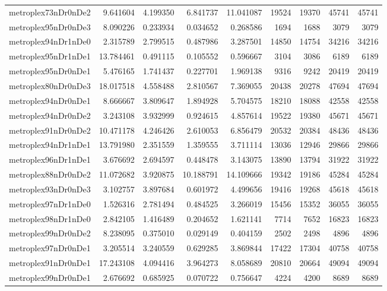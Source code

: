 \begin{longtable}{|l|r|r|r|r|r|r|r|r|}
metroplex73nDr0nDe2 & 9.641604 & 4.199350 & 6.841737 & 11.041087 & 19524 & 19370 & 45741 & 45741 \\
metroplex95nDr0nDe3 & 8.090226 & 0.233934 & 0.034652 & 0.268586 & 1694 & 1688 & 3079 & 3079 \\
metroplex94nDr1nDe0 & 2.315789 & 2.799515 & 0.487986 & 3.287501 & 14850 & 14754 & 34216 & 34216 \\
metroplex95nDr1nDe1 & 13.784461 & 0.491115 & 0.105552 & 0.596667 & 3104 & 3086 & 6189 & 6189 \\
metroplex95nDr0nDe1 & 5.476165 & 1.741437 & 0.227701 & 1.969138 & 9316 & 9242 & 20419 & 20419 \\
metroplex80nDr0nDe3 & 18.017518 & 4.558488 & 2.810567 & 7.369055 & 20438 & 20278 & 47694 & 47694 \\
metroplex94nDr0nDe1 & 8.666667 & 3.809647 & 1.894928 & 5.704575 & 18210 & 18088 & 42558 & 42558 \\
metroplex94nDr0nDe2 & 3.243108 & 3.932999 & 0.924615 & 4.857614 & 19522 & 19380 & 45671 & 45671 \\
metroplex91nDr0nDe2 & 10.471178 & 4.246426 & 2.610053 & 6.856479 & 20532 & 20384 & 48436 & 48436 \\
metroplex94nDr1nDe1 & 13.791980 & 2.351559 & 1.359555 & 3.711114 & 13036 & 12946 & 29866 & 29866 \\
metroplex96nDr1nDe1 & 3.676692 & 2.694597 & 0.448478 & 3.143075 & 13890 & 13794 & 31922 & 31922 \\
metroplex88nDr0nDe2 & 11.072682 & 3.920875 & 10.188791 & 14.109666 & 19342 & 19186 & 45284 & 45284 \\
metroplex93nDr0nDe3 & 3.102757 & 3.897684 & 0.601972 & 4.499656 & 19416 & 19268 & 45618 & 45618 \\
metroplex97nDr1nDe0 & 1.526316 & 2.781494 & 0.484525 & 3.266019 & 15456 & 15352 & 36055 & 36055 \\
metroplex98nDr1nDe0 & 2.842105 & 1.416489 & 0.204652 & 1.621141 & 7714 & 7652 & 16823 & 16823 \\
metroplex99nDr0nDe2 & 8.238095 & 0.375010 & 0.029149 & 0.404159 & 2502 & 2498 & 4896 & 4896 \\
metroplex97nDr0nDe1 & 3.205514 & 3.240559 & 0.629285 & 3.869844 & 17422 & 17304 & 40758 & 40758 \\
metroplex91nDr0nDe1 & 17.243108 & 4.094416 & 3.964273 & 8.058689 & 20810 & 20664 & 49094 & 49094 \\
metroplex99nDr0nDe1 & 2.676692 & 0.685925 & 0.070722 & 0.756647 & 4224 & 4200 & 8689 & 8689 \\

\end{longtable}
